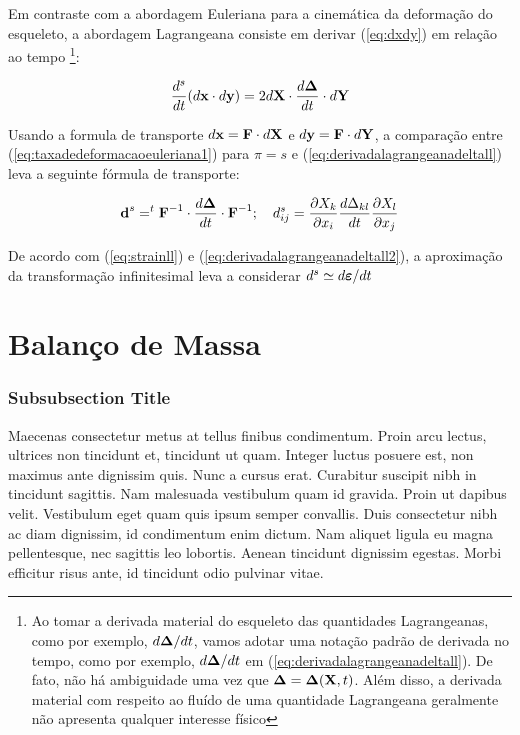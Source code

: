 \documentclass[
	11pt, %
	fleqn, %
	a4paper, %
]{LegrandOrangeBook}
\begin{document}
Em contraste com a abordagem Euleriana para a cinemática da deformação do esqueleto, a abordagem Lagrangeana consiste em derivar (\ref{eq:dxdy}) em relação ao tempo \footnote{Ao tomar a derivada material do esqueleto das quantidades Lagrangeanas, como por exemplo, $d\bm{\Delta}/dt$, vamos adotar uma notação padrão de derivada no tempo, como por exemplo, $d\bm{\Delta}/dt$ em (\ref{eq:derivadalagrangeanadeltall}). De fato, não há ambiguidade uma vez que $\bm{\Delta} = \bm{\Delta}(\textbf{X},t)$. Além disso, a derivada material com respeito ao fluído de uma quantidade Lagrangeana geralmente não apresenta qualquer interesse físico}:

\begin{equation}
	\label{eq:derivadalagrangeanadeltall}	
	\dfrac{d^s}{dt}(d\textbf{x} \cdot d\textbf{y}) = 2d\textbf{X} \cdot \dfrac{d\bm{\Delta}}{dt} \cdot d\textbf{Y}
\end{equation}

Usando a formula de transporte $d\textbf{x} = \textbf{F} \cdot d\textbf{X}$ e $d\textbf{y} = \textbf{F} \cdot d\textbf{Y}$, a comparação entre (\ref{eq:taxadedeformacaoeuleriana1}) para $\pi = s$ e (\ref{eq:derivadalagrangeanadeltall}) leva a seguinte fórmula de transporte:

\begin{equation}
	\label{eq:derivadalagrangeanadeltall2}	
	\textbf{d}^s = ^{t}\textbf{F}^{-1} \cdot \dfrac{d\bm{\Delta}}{dt} \cdot \textbf{F}^{-1}; ~~~ d_{ij}^s = \dfrac{\partial X_k}{\partial x_i}\dfrac{d\Delta_{kl}}{dt}\dfrac{\partial X_l}{\partial x_j}
\end{equation}

De acordo com (\ref{eq:strainll}) e (\ref{eq:derivadalagrangeanadeltall2}), a aproximação da transformação infinitesimal leva a considerar $d^s \simeq d\bm{\varepsilon}/dt$

\section{Balanço de Massa}

\subsubsection{Subsubsection Title} 

Maecenas consectetur metus at tellus finibus condimentum. Proin arcu lectus, ultrices non tincidunt et, tincidunt ut quam. Integer luctus posuere est, non maximus ante dignissim quis. Nunc a cursus erat. Curabitur suscipit nibh in tincidunt sagittis. Nam malesuada vestibulum quam id gravida. Proin ut dapibus velit. Vestibulum eget quam quis ipsum semper convallis. Duis consectetur nibh ac diam dignissim, id condimentum enim dictum. Nam aliquet ligula eu magna pellentesque, nec sagittis leo lobortis. Aenean tincidunt dignissim egestas. Morbi efficitur risus ante, id tincidunt odio pulvinar vitae.
\end{document}
